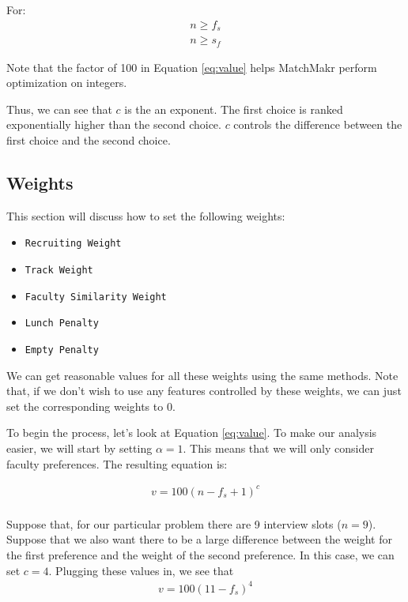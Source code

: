 For:
\begin{equation}
	\label{eq:n}
	\begin{aligned}
		n \ge f_s \\
		n \ge s_f  
	\end{aligned}
\end{equation}

Note that the factor of 100 in Equation \ref{eq:value} helps MatchMakr perform optimization on integers.

Thus, we can see that $c$ is the an exponent. The first choice is ranked exponentially higher than the second choice.  $c$ controls the difference between the first choice and the second choice.

\pagebreak
\subsection{Weights}

This section will discuss how to set the following weights:
\begin{itemize}
	\item \texttt{Recruiting Weight}
	\item \texttt{Track Weight}
	\item \texttt{Faculty Similarity Weight}
	\item \texttt{Lunch Penalty}
	\item \texttt{Empty Penalty}
\end{itemize}

We can get reasonable values for all these weights using the same methods.  Note that, if we don't wish to use any features controlled by these weights, we can just set the corresponding weights to 0.

To begin the process, let's look at Equation \ref{eq:value}.  To make our analysis easier, we will start by setting $\alpha = 1$.  This means that we will only consider faculty preferences.  The resulting equation is:

\begin{equation}
	\begin{aligned}
		v = 100 (n - f_s + 1)^c  \\
	\end{aligned}
\end{equation}

Suppose that, for our particular problem there are 9 interview slots ($n=9$).  Suppose that we also want there to be a large difference between the weight for the first preference and the weight of the second preference.  In this case, we can set $c=4$.  Plugging these values in, we see that
\begin{equation}
	\begin{aligned}
		v = 100 (11 - f_s)^4  \\
	\end{aligned}
\end{equation}


